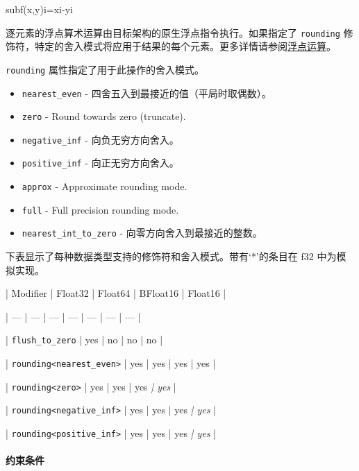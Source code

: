 \documentclass{article}
\begin{document}
subf(x,y)i=xi-yi


逐元素的浮点算术运算由目标架构的原生浮点指令执行。如果指定了 \texttt{rounding} 修饰符，特定的舍入模式将应用于结果的每个元素。更多详情请参阅\href{https://docs.nvidia.com/cuda/tile-ir/latest/sections/operations.html#op-group-floating-point}{浮点运算}。



\texttt{rounding} 属性指定了用于此操作的舍入模式。



\begin{itemize}
\item \texttt{nearest\_even} - 四舍五入到最接近的值（平局时取偶数）。
\item \texttt{zero} - Round towards zero (truncate).

\item \texttt{negative\_inf} - 向负无穷方向舍入。
\item \texttt{positive\_inf} - 向正无穷方向舍入。
\item \texttt{approx} - Approximate rounding mode.

\item \texttt{full} - Full precision rounding mode.

\item \texttt{nearest\_int\_to\_zero} - 向零方向舍入到最接近的整数。


\end{itemize}
下表显示了每种数据类型支持的修饰符和舍入模式。带有`*'的条目在 f32 中为模拟实现。



| Modifier | Float32 | Float64 | BFloat16 | Float16 |


| --- | --- | --- | --- | --- | --- | --- |


| \texttt{flush\_to\_zero} | yes | no | no | no |


| \texttt{rounding<nearest\_even>} | yes | yes | yes | yes |


| \texttt{rounding<zero>} | yes | yes | yes\textit{ | yes} |


| \texttt{rounding<negative\_inf>} | yes | yes | yes\textit{ | yes} |


| \texttt{rounding<positive\_inf>} | yes | yes | yes\textit{ | yes} |






\paragraph{约束条件}
\end{document}
